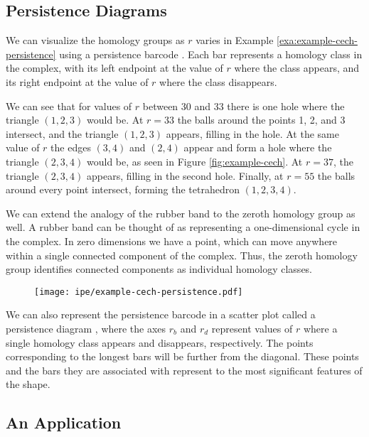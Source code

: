 \subsection{Persistence Diagrams}

We can visualize the homology groups as \(r\) varies in Example \ref{exa:example-cech-persistence} using a persistence barcode .
Each bar represents a homology class in the complex, with its left endpoint at the value of \(r\) where the class appears, and its right endpoint at the value of \(r\) where the class disappears.

We can see that for values of \(r\) between 30 and 33 there is one hole where the triangle \((1,2,3)\) would be.
At \(r=33\) the balls around the points 1, 2, and 3 intersect, and the triangle \((1,2,3)\) appears, filling in the hole.
At the same value of \(r\) the edges \((3,4)\) and \((2,4)\) appear and form a hole where the triangle \((2,3,4)\) would be, as seen in Figure \ref{fig:example-cech}.
At \(r=37\), the triangle \((2,3,4)\) appears, filling in the second hole.
Finally, at \(r=55\) the balls around every point intersect, forming the tetrahedron \((1,2,3,4)\).

We can extend the analogy of the rubber band to the zeroth homology group as well.
A rubber band can be thought of as representing a one-dimensional cycle in the complex.
In zero dimensions we have a point, which can move anywhere within a single connected component of the complex.
Thus, the zeroth homology group identifies connected components as individual homology classes.

\begin{figure}
    \centering
    \texttt{[image: ipe/example-cech-persistence.pdf]}
    \caption{}
    \label{fig:example-cech-persistence}
\end{figure}

We can also represent the persistence barcode in a scatter plot called a persistence diagram , where the axes \(r_b\) and \(r_d\) represent values of \(r\) where a single homology class appears and disappears, respectively.
The points corresponding to the longest bars will be further from the diagonal. These points and the bars they are associated with represent to the most significant features of the shape.

\subsection{An Application}

